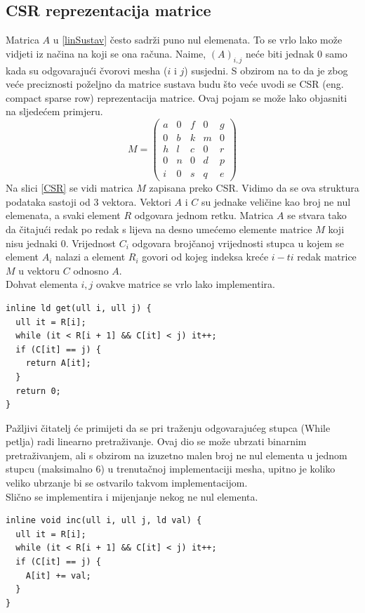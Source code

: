 \documentclass[zavrsnirad]{../fer}
\begin{document}
\subsection{CSR reprezentacija matrice}
Matrica $A$ u \ref{linSustav} 
često sadrži puno nul elemenata. To se vrlo lako može 
vidjeti iz načina na koji se ona računa. Naime, $(A)_{i,j}$ 
neće biti jednak $0$ samo kada su odgovarajući čvorovi 
mesha ($i$ i $j$) susjedni. S obzirom na to da je 
zbog veće preciznosti poželjno da
matrice sustava budu što veće uvodi se CSR (eng. compact sparse row)
reprezentacija matrice. Ovaj pojam se može lako objasniti na
sljedećem primjeru.
$$M = \begin{pmatrix}
  a & 0 & f & 0 & g\\ 
  0 & b & k & m & 0\\ 
  h & l & c & 0 & r\\ 
  0 & n & 0 & d & p\\ 
  i & 0 & s & q & e
\end{pmatrix}$$
Na slici \ref{CSR} 
se vidi matrica $M$ zapisana preko CSR. Vidimo da se
ova struktura podataka sastoji od 3 vektora. 
Vektori $A$ i $C$ su jednake veličine kao broj ne nul 
elemenata, a svaki element $R$ odgovara jednom retku.
Matrica $A$ se stvara tako da čitajući redak po redak
s lijeva na desno umećemo elemente matrice $M$ koji 
nisu jednaki $0$. Vrijednost $C_i$ odgovara brojčanoj
vrijednosti stupca u kojem se element $A_i$ nalazi 
a element $R_i$ govori od kojeg indeksa kreće $i-ti$
redak matrice $M$ u vektoru $C$ odnosno $A$. 
\\ 
\bigskip
Dohvat elementa $i,j$ ovakve matrice se vrlo lako implementira.
\begin{verbatim}
inline ld get(ull i, ull j) {
  ull it = R[i];
  while (it < R[i + 1] && C[it] < j) it++;
  if (C[it] == j) {
    return A[it];
  }
  return 0;
}
\end{verbatim}
Pažljivi čitatelj će primijeti da se pri traženju odgovarajućeg
stupca (While petlja) radi linearno pretraživanje. Ovaj dio 
se može ubrzati binarnim pretraživanjem, ali s obzirom na 
izuzetno malen broj ne nul elementa u jednom stupcu (maksimalno $6$)
u trenutačnoj implementaciji mesha, upitno je koliko veliko ubrzanje 
bi se ostvarilo takvom implementacijom.
\\ 
\bigskip
Slično se implementira i mijenjanje nekog ne nul elementa.
\begin{verbatim}
inline void inc(ull i, ull j, ld val) {
  ull it = R[i];
  while (it < R[i + 1] && C[it] < j) it++;
  if (C[it] == j) {
    A[it] += val;
  }
}
\end{verbatim}
\end{document}
